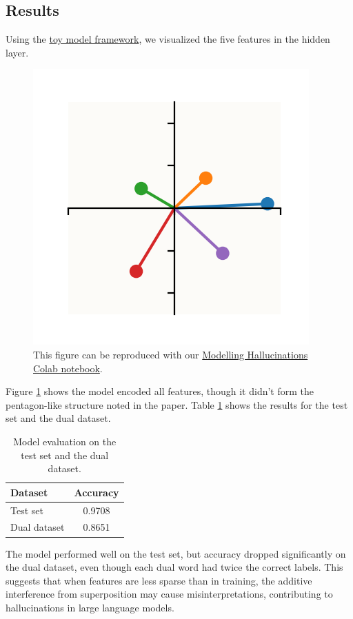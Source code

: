 \subsection{Results}
Using the \href{https://colab.research.google.com/github/anthropics/toy-models-of-superposition/blob/main/toy_models.ipynb}{toy model framework}, we visualized the five features in the hidden layer.
\begin{figure}[h]
	\centering
	\includegraphics[width=0.3\linewidth]{figures/hallucinations_hidden_layer.png}
	\caption{This figure can be reproduced with our \href{https://colab.research.google.com/github/smurphnerd/FIT5047-assignment4/blob/main/modelling_hallucinations.ipynb}{Modelling Hallucinations Colab notebook}.}
	\label{fig:hidden_layer_representation}
\end{figure}
Figure \ref{fig:hidden_layer_representation} shows the model encoded all features, though it didn't form the pentagon-like structure noted in the paper.
Table \ref{tab:hallucinations_results} shows the results for the test set and the dual dataset.
\begin{table}[h]
	\centering
	\begin{tabular}{lc}
		\toprule
		\textbf{Dataset} & \textbf{Accuracy} \\
		\midrule
		Test set         & 0.9708            \\
		Dual dataset     & 0.8651            \\
		\bottomrule
	\end{tabular}
	\caption{Model evaluation on the test set and the dual dataset.}
	\label{tab:hallucinations_results}
\end{table}
The model performed well on the test set, but accuracy dropped significantly on the dual dataset, even though each dual word had twice the correct labels.
This suggests that when features are less sparse than in training, the additive interference from superposition may cause misinterpretations, contributing to hallucinations in large language models.
